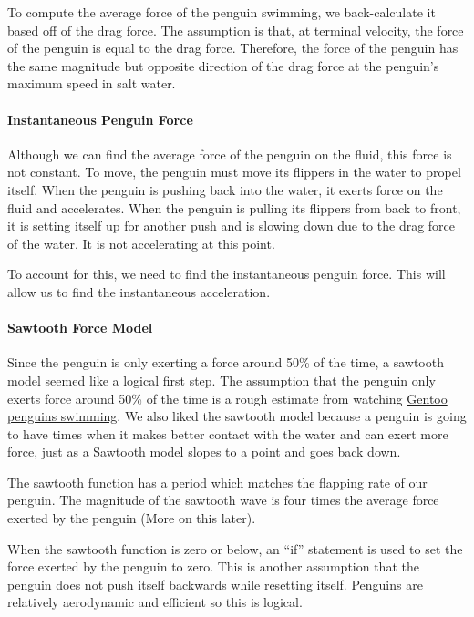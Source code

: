 \documentclass[11pt]{article}
\begin{document}
To compute the average force of the penguin swimming, we back-calculate
it based off of the drag force. The assumption is that, at terminal
velocity, the force of the penguin is equal to the drag force.
Therefore, the force of the penguin has the same magnitude but opposite
direction of the drag force at the penguin's maximum speed in salt
water.

\hypertarget{instantaneous-penguin-force}{%
\paragraph{Instantaneous Penguin
Force}\label{instantaneous-penguin-force}}

Although we can find the average force of the penguin on the fluid, this
force is not constant. To move, the penguin must move its flippers in
the water to propel itself. When the penguin is pushing back into the
water, it exerts force on the fluid and accelerates. When the penguin is
pulling its flippers from back to front, it is setting itself up for
another push and is slowing down due to the drag force of the water. It
is not accelerating at this point.

To account for this, we need to find the instantaneous penguin force.
This will allow us to find the instantaneous acceleration.

\hypertarget{sawtooth-force-model}{%
\paragraph{Sawtooth Force Model}\label{sawtooth-force-model}}

Since the penguin is only exerting a force around 50\% of the time, a
sawtooth model seemed like a logical first step. The assumption that the
penguin only exerts force around 50\% of the time is a rough estimate
from watching \href{https://www.youtube.com/watch?v=_TXKiz_DGc4}{Gentoo
penguins swimming}. We also liked the sawtooth model because a penguin
is going to have times when it makes better contact with the water and
can exert more force, just as a Sawtooth model slopes to a point and
goes back down.

The sawtooth function has a period which matches the flapping rate of
our penguin. The magnitude of the sawtooth wave is four times the
average force exerted by the penguin (More on this later).

When the sawtooth function is zero or below, an ``if'' statement is used
to set the force exerted by the penguin to zero. This is another
assumption that the penguin does not push itself backwards while
resetting itself. Penguins are relatively aerodynamic and efficient so
this is logical.
\end{document}
